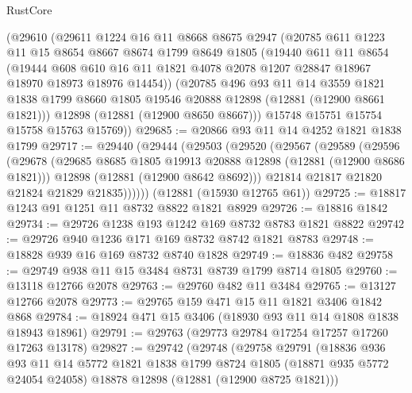\begin{lexlean}{RustCore}
\begin{coremodule}
    (@29610
      (@29611
        @1224
        @16
        @11
        @8668
        @8675
        @2947
        (@20785
          @611
          @1223
          @11
          @15
          @8654
          @8667
          @8674
          @1799
          @8649
          @1805
          (@19440
            @611
            @11
            @8654
            (@19444
              @608
              @610
              @16
              @11
              @1821
              @4078
              @2078
              @1207
              @28847
              @18967
              @18970
              @18973
              @18976
              @14454))
          (@20785
            @496
            @93
            @11
            @14
            @3559
            @1821
            @1838
            @1799
            @8660
            @1805
            @19546
            @20888
            @12898
            (@12881 (@12900 @8661 @1821)))
          @12898
          (@12881 (@12900 @8650 @8667)))
        @15748
        @15751
        @15754
        @15758
        @15763
        @15769))
@29685 := @20866 @93 @11 @14 @4252 @1821 @1838 @1799
@29717 := @29440
    (@29444
      (@29503
        (@29520
          (@29567
            (@29589
              (@29596
                (@29678
                  (@29685 @8685 @1805 @19913 @20888 @12898 (@12881 (@12900 @8686 @1821)))
                  @12898
                  (@12881 (@12900 @8642 @8692)))
                @21814
                @21817
                @21820
                @21824
                @21829
                @21835))))))
    (@12881 (@15930 @12765 @61))
@29725 := @18817 @1243 @91 @1251 @11 @8732 @8822 @1821 @8929
@29726 := @18816 @1842
@29734 := @29726 @1238 @193 @1242 @169 @8732 @8783 @1821 @8822
@29742 := @29726 @940 @1236 @171 @169 @8732 @8742 @1821 @8783
@29748 := @18828 @939 @16 @169 @8732 @8740 @1828
@29749 := @18836 @482
@29758 := @29749 @938 @11 @15 @3484 @8731 @8739 @1799 @8714 @1805
@29760 := @13118 @12766 @2078
@29763 := @29760 @482 @11 @3484
@29765 := @13127 @12766 @2078
@29773 := @29765 @159 @471 @15 @11 @1821 @3406 @1842 @868
@29784 := @18924 @471 @15 @3406 (@18930 @93 @11 @14 @1808 @1838 @18943 @18961)
@29791 := @29763 (@29773 @29784 @17254 @17257 @17260 @17263 @13178)
@29827 := @29742
    (@29748
      (@29758
        @29791
        (@18836
          @936
          @93
          @11
          @14
          @5772
          @1821
          @1838
          @1799
          @8724
          @1805
          (@18871 @935 @5772 @24054 @24058)
          @18878
          @12898
          (@12881 (@12900 @8725 @1821)))

\end{coremodule}
\end{lexlean}

